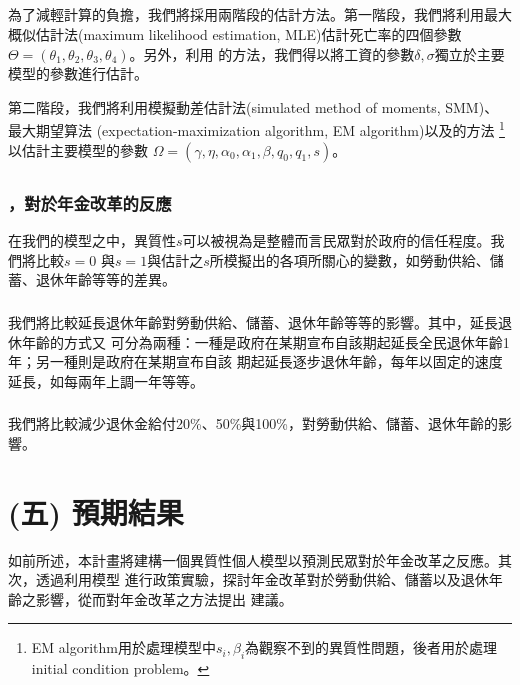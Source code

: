 \documentclass[12pt]{article}
\begin{document}
\begin{CJK*}{UTF8}{bkai}
\subsection*{}
為了減輕計算的負擔，我們將採用兩階段的估計方法。第一階段，我們將利用最大
概似估計法(maximum likelihood estimation, MLE)估計死亡率的四個參數
$\Theta = (\theta_1,\theta_2,\theta_3,\theta_4)$。另外，利用\cite{pistaferri2015}
的方法，我們得以將工資的參數$\delta,\sigma$獨立於主要模型的參數進行估計。

第二階段，我們將利用模擬動差估計法(simulated method of moments, SMM)、最大期望算法
(expectation-maximization algorithm, EM algorithm)以及\cite{wooldridge2005}的方法
\footnote{EM algorithm用於處理模型中$s_i,\beta_i$為觀察不到的異質性問題，後者用於處理
initial condition problem。}以估計主要模型的參數
$\Omega = (\gamma,\eta,\alpha_0,\alpha_1,\beta,q_0,q_1,s)$。

\subsection*{}
\subsubsection*{，對於年金改革的反應}
在我們的模型之中，異質性$s$可以被視為是整體而言民眾對於政府的信任程度。我們將比較$s=0$
與$s=1$與估計之$s$所模擬出的各項所關心的變數，如勞動供給、儲蓄、退休年齡等等的差異。
\subsubsection*{}
我們將比較延長退休年齡對勞動供給、儲蓄、退休年齡等等的影響。其中，延長退休年齡的方式又
可分為兩種：一種是政府在某期宣布自該期起延長全民退休年齡1年；另一種則是政府在某期宣布自該
期起延長逐步退休年齡，每年以固定的速度延長，如每兩年上調一年等等。
\subsubsection*{}
我們將比較減少退休金給付20\%、50\%與100\%，對勞動供給、儲蓄、退休年齡的影響。

\subsection*{}

\section*{\normalfont(五) 預期結果}
如前所述，本計畫將建構一個異質性個人模型以預測民眾對於年金改革之反應。其次，透過利用模型
進行政策實驗，探討年金改革對於勞動供給、儲蓄以及退休年齡之影響，從而對年金改革之方法提出
建議。

\end{CJK*}
\end{document}
